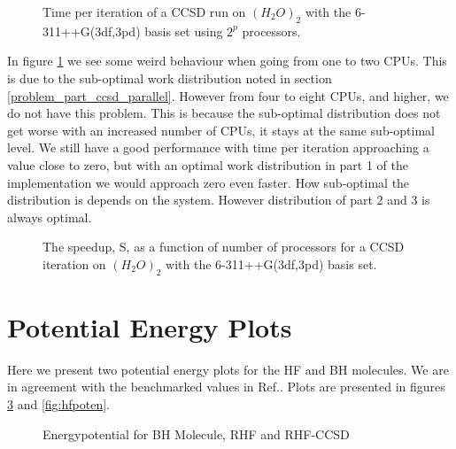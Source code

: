 \documentclass[a4paper,norsk,11pt,twoside]{report}
\begin{document}
\begin{figure}[h!]
\begin{center}
\caption{Time per iteration of a CCSD run on $(H_2O)_2$ with the 6-311++G(3df,3pd) basis set using $2^p$ processors.}
\label{fig:ccsd_2h2o_time_per_iter}
\end{center}
\end{figure}

In figure \ref{fig:ccsd_2h2o_time_per_iter} we see some weird behaviour when going from one to two CPUs. This is due to the sub-optimal work distribution noted in section \ref{problem_part_ccsd_parallel}. However from four to eight CPUs, and higher, we do not have this problem. This is because the sub-optimal distribution does not get worse with an increased number of CPUs, it stays at the same sub-optimal level. We still have a good performance with time per iteration approaching a value close to zero, but with an optimal work distribution in part 1 of the implementation we would approach zero even faster. How sub-optimal the distribution is depends on the system. However distribution of part 2 and 3 is always optimal. 

\newpage


\begin{figure}[h!]
\begin{center}
\caption{The speedup, S, as a function of number of processors for a CCSD iteration on $(H_2O)_2$ with the 6-311++G(3df,3pd) basis set.}
\label{fig:ccsd_2h2o_time_speedup}
\end{center}
\end{figure}

\newpage

\section{Potential Energy Plots}
Here we present two potential energy plots for the HF and BH molecules. We are in agreement with the benchmarked values in  Ref.\cite{potential_energy_citation_plots}. Plots are presented in figures \ref{fig:bhpoten} and \ref{fig:hfpoten}. \\

\begin{figure}[h!]
\begin{center}
\caption{Energypotential for BH Molecule, RHF and RHF-CCSD}
\label{fig:bhpoten}
\end{center}
\end{figure}
\end{document}

